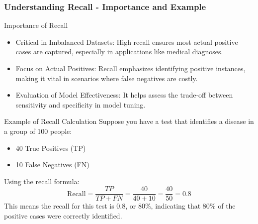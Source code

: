 \documentclass[aspectratio=169]{beamer}
\begin{document}
\begin{frame}[fragile]
    \frametitle{Understanding Recall - Importance and Example}
    \begin{block}{Importance of Recall}
        \begin{itemize}
            \item Critical in Imbalanced Datasets: High recall ensures most actual positive cases are captured, especially in applications like medical diagnoses.
            \item Focus on Actual Positives: Recall emphasizes identifying positive instances, making it vital in scenarios where false negatives are costly.
            \item Evaluation of Model Effectiveness: It helps assess the trade-off between sensitivity and specificity in model tuning.
        \end{itemize}
    \end{block}
    
    \begin{block}{Example of Recall Calculation}
        Suppose you have a test that identifies a disease in a group of 100 people:
        \begin{itemize}
            \item 40 True Positives (TP)
            \item 10 False Negatives (FN)
        \end{itemize}
        Using the recall formula:
        \[
        \text{Recall} = \frac{TP}{TP + FN} = \frac{40}{40 + 10} = \frac{40}{50} = 0.8
        \]
        This means the recall for this test is 0.8, or 80\%, indicating that 80\% of the positive cases were correctly identified.
    \end{block}
\end{frame}
\end{document}
